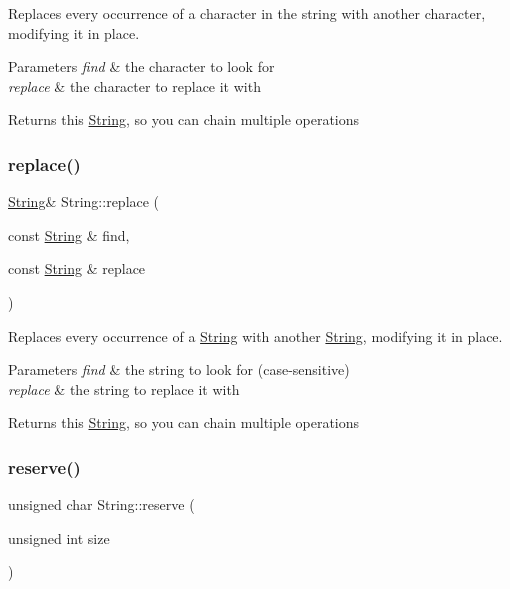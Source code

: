 Replaces every occurrence of a character in the string with another character, modifying it in place. 


\begin{DoxyParams}{Parameters}
{\em find} & the character to look for\\
\hline
{\em replace} & the character to replace it with\\
\hline
\end{DoxyParams}
\begin{DoxyReturn}{Returns}
this \hyperlink{class_string}{String}, so you can chain multiple operations 
\end{DoxyReturn}
\mbox{\label{class_string_a6b91a0ceae7dd3f86b952ce2cebf783c}} 
\subsubsection{\texorpdfstring{replace()}{replace()}\hspace{0.1cm}{\footnotesize\ttfamily [2/2]}}
{\footnotesize\ttfamily \hyperlink{class_string}{String}\& String\+::replace (\begin{DoxyParamCaption}\item[{const \hyperlink{class_string}{String} \&}]{find,  }\item[{const \hyperlink{class_string}{String} \&}]{replace }\end{DoxyParamCaption})}



Replaces every occurrence of a \hyperlink{class_string}{String} with another \hyperlink{class_string}{String}, modifying it in place. 


\begin{DoxyParams}{Parameters}
{\em find} & the string to look for (case-\/sensitive)\\
\hline
{\em replace} & the string to replace it with\\
\hline
\end{DoxyParams}
\begin{DoxyReturn}{Returns}
this \hyperlink{class_string}{String}, so you can chain multiple operations 
\end{DoxyReturn}
\mbox{\label{class_string_a138edcc762cb87649d81757d1e4ab419}} 
\subsubsection{\texorpdfstring{reserve()}{reserve()}}
{\footnotesize\ttfamily unsigned char String\+::reserve (\begin{DoxyParamCaption}\item[{unsigned int}]{size }\end{DoxyParamCaption})}



